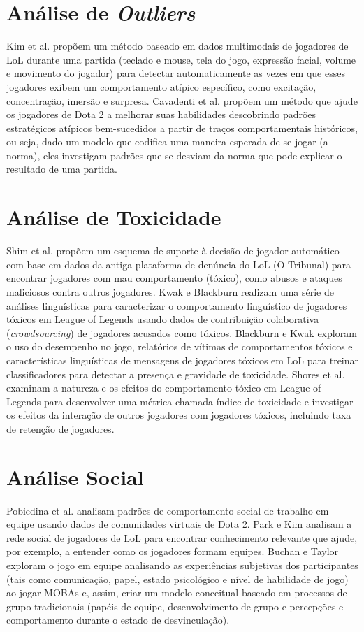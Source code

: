 \section{Análise de \textit{Outliers}}
Kim et al. \cite{kim2015efficiently} propõem um método baseado em dados multimodais de jogadores de LoL durante uma partida (teclado e mouse, tela do jogo, expressão facial, volume e movimento do jogador) para detectar automaticamente as vezes em que esses jogadores exibem um comportamento atípico específico, como excitação, concentração, imersão e surpresa. Cavadenti et al. \cite{cavadenti2016did} propõem um método que ajude os jogadores de Dota 2 a melhorar suas habilidades descobrindo padrões estratégicos atípicos bem-sucedidos a partir de traços comportamentais históricos, ou seja, dado um modelo que codifica uma maneira esperada de se jogar (a norma), eles investigam padrões que se desviam da norma que pode explicar o resultado de uma partida.

\section{Análise de Toxicidade}
Shim et al. \cite{shim2014decision} propõem um esquema de suporte à decisão de jogador automático com base em dados da antiga plataforma de denúncia do LoL (O Tribunal) para encontrar jogadores com mau comportamento (tóxico), como abusos e ataques maliciosos contra outros jogadores. Kwak e Blackburn \cite{kwak2014linguistic} realizam uma série de análises linguísticas para caracterizar o comportamento linguístico de jogadores tóxicos em League of Legends usando dados de contribuição colaborativa (\textit{crowdsourcing}) de jogadores acusados como tóxicos. Blackburn e Kwak \cite{blackburn2014stfu} exploram o uso do desempenho no jogo, relatórios de vítimas de comportamentos tóxicos e características linguísticas de mensagens de jogadores tóxicos em LoL para treinar classificadores para detectar a presença e gravidade de toxicidade. Shores et al. \cite{shores2014identification} examinam a natureza e os efeitos do comportamento tóxico em League of Legends para desenvolver uma métrica chamada índice de toxicidade e investigar os efeitos da interação de outros jogadores com jogadores tóxicos, incluindo taxa de retenção de jogadores.

\section{Análise Social}
Pobiedina et al. \cite{pobiedina2013ranking} analisam padrões de comportamento social de trabalho em equipe usando dados de comunidades virtuais de Dota 2. Park e Kim \cite{park2014social} analisam a rede social de jogadores de LoL para encontrar conhecimento relevante que ajude, por exemplo, a entender como os jogadores formam equipes. Buchan e Taylor \cite{buchan2016qualitative} exploram o jogo em equipe analisando as experiências subjetivas dos participantes (tais como comunicação, papel, estado psicológico e nível de habilidade de jogo) ao jogar MOBAs e, assim, criar um modelo conceitual baseado em processos de grupo tradicionais (papéis de equipe, desenvolvimento de grupo e percepções e comportamento durante o estado de desvinculação).

